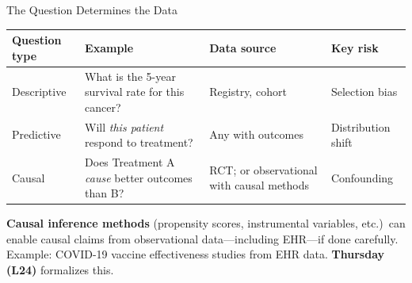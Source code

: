 \documentclass[aspectratio=169,10pt]{beamer}
\begin{document}
\begin{frame}{The Question Determines the Data}
\begin{center}
{\small
\renewcommand{\arraystretch}{1.2}
\begin{tabular}{lp{3.5cm}p{3cm}p{3cm}}
\toprule
\textbf{Question type} & \textbf{Example} & \textbf{Data source} & \textbf{Key risk} \\
\midrule
Descriptive & What is the 5-year survival rate for this cancer? & Registry, cohort & Selection bias \\
Predictive & Will \emph{this patient} respond to treatment? & Any with outcomes & Distribution shift \\
Causal & Does Treatment A \emph{cause} better outcomes than B? & RCT; or observational with causal methods & Confounding \\
\bottomrule
\end{tabular}
}
\end{center}

\vspace{0.1em}
\pause
\textbf{Causal inference methods} (propensity scores, instrumental variables, etc.)\ can enable causal claims from observational data---including EHR---if done carefully. Example: COVID-19 vaccine effectiveness studies from EHR data. \textbf{Thursday (L24)} formalizes this.
\end{frame}
\end{document}

